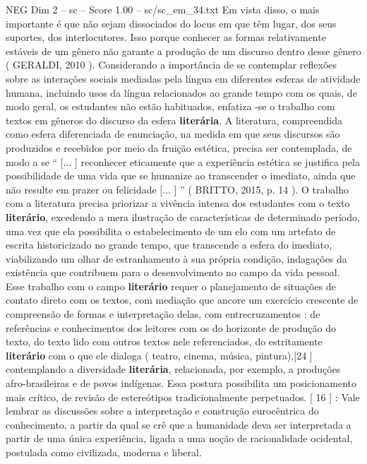 \begin{textsample}{NEG Dim 2 – sc – Score 1.00 – sc/sc\_em\_34.txt}
Em vista disso, o mais importante é que não sejam dissociados do locus em que têm lugar, dos seus suportes, dos interlocutores.
Isso porque conhecer as formas relativamente estáveis de um gênero não garante a produção de um discurso dentro desse gênero ( GERALDI, 2010 ).
Considerando a importância de se contemplar reflexões sobre as interações sociais mediadas pela língua em diferentes esferas de atividade humana, incluindo usos da língua relacionados ao grande tempo com os quais, de modo geral, os estudantes não estão habituados, enfatiza -se o trabalho com textos em gêneros do discurso da esfera \textbf{literária}.
A literatura, compreendida como esfera diferenciada de enunciação, na medida em que seus discursos são produzidos e recebidos por meio da fruição estética, precisa ser contemplada, de modo a se “ [... ] reconhecer eticamente que a experiência estética se justifica pela possibilidade de uma vida que se humanize ao transcender o imediato, ainda que não resulte em prazer ou felicidade [... ] ” ( BRITTO, 2015, p. 14 ).
O trabalho com a literatura precisa priorizar a vivência intensa dos estudantes com o texto \textbf{literário}, excedendo a mera ilustração de características de determinado período, uma vez que ela possibilita o estabelecimento de um elo com um artefato de escrita historicizado no grande tempo, que transcende a esfera do imediato, viabilizando um olhar de estranhamento à sua própria condição, indagações da existência que contribuem para o desenvolvimento no campo da vida pessoal.
Esse trabalho com o campo \textbf{literário} requer o planejamento de situações de contato direto com os textos, com mediação que ancore um exercício crescente de compreensão de formas e interpretação delas, com entrecruzamentos : de referências e conhecimentos dos leitores com os do horizonte de produção do texto, do texto lido com outros textos nele referenciados, do estritamente \textbf{literário} com o que ele dialoga ( teatro, cinema, música, pintura),[24 ] contemplando a diversidade \textbf{literária}, relacionada, por exemplo, a produções afro-brasileiras e de povos indígenas.
Essa postura possibilita um posicionamento mais crítico, de revisão de estereótipos tradicionalmente perpetuados. [ 16 ] : Vale lembrar as discussões sobre a interpretação e construção eurocêntrica do conhecimento, a partir da qual se crê que a humanidade deva ser interpretada a partir de uma única experiência, ligada a uma noção de racionalidade ocidental, postulada como civilizada, moderna e liberal.

\end{textsample}
